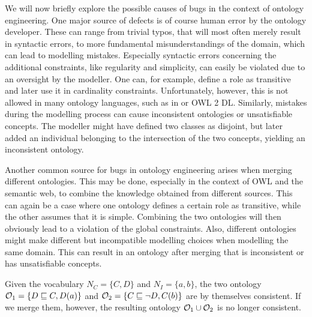 We will now briefly explore the possible causes of bugs in the context of ontology engineering. One major source of defects is of course human error by the ontology developer. These can range from trivial typos, that will most often merely result in syntactic errors, to more fundamental misunderstandings of the domain, which can lead to modelling mistakes. Especially syntactic errors concerning the additional constraints, like regularity and simplicity, can easily be violated due to an oversight by the modeller. One can, for example, define a role as transitive and later use it in cardinality constraints. Unfortunately, however, this is not allowed in many ontology languages, such as in \SROIQ or OWL 2 DL. Similarly, mistakes during the modelling process can cause inconsistent ontologies or unsatisfiable concepts. The modeller might have defined two classes as disjoint, but later added an individual belonging to the intersection of the two concepts, yielding an inconsistent ontology.

Another common source for bugs in ontology engineering arises when merging different ontologies. This may be done, especially in the context of OWL and the semantic web, to combine the knowledge obtained from different sources. This can again be a case where one ontology defines a certain role as transitive, while the other assumes that it is simple. Combining the two ontologies will then obviously lead to a violation of the global constraints. Also, different ontologies might make different but incompatible modelling choices when modelling the same domain. This can result in an ontology after merging that is inconsistent or has unsatisfiable concepts.

\begin{example}
  Given the vocabulary $N_C = \{ C, D \}$ and $N_I = \{ a, b \}$, the two \SROIQ ontology $\mathcal{O}_1 = \{ D \sqsubseteq C, D(a) \}$ and $\mathcal{O}_2 = \{ C \sqsubseteq \lnot D, C(b) \}$ are by themselves consistent. If we merge them, however, the resulting ontology $\mathcal{O}_1 \cup \mathcal{O}_2$ is no longer consistent.
\end{example}
